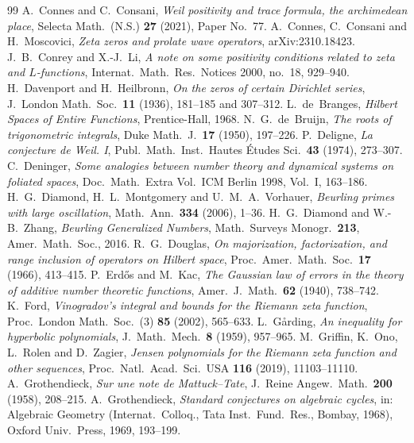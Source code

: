 \documentclass[11pt]{amsart}
\theoremstyle{definition}
\theoremstyle{remark}
\numberwithin{equation}{section}
\begin{document}
\begin{thebibliography}{99}
 A.~Connes and C.~Consani, \emph{Weil positivity and trace formula, the archimedean place}, Selecta Math.\ (N.S.) \textbf{27} (2021), Paper No.~77.
 A.~Connes, C.~Consani and H.~Moscovici, \emph{Zeta zeros and prolate wave operators}, arXiv:2310.18423.
 J.~B.~Conrey and X.-J.~Li, \emph{A note on some positivity conditions related to zeta and $L$-functions}, Internat.\ Math.\ Res.\ Notices 2000, no.~18, 929--940.
 H.~Davenport and H.~Heilbronn, \emph{On the zeros of certain Dirichlet series}, J.\ London Math.\ Soc.\ \textbf{11} (1936), 181--185 and 307--312.
 L.~de~Branges, \emph{Hilbert Spaces of Entire Functions}, Prentice-Hall, 1968.
 N.~G.~de~Bruijn, \emph{The roots of trigonometric integrals}, Duke Math.\ J.\ \textbf{17} (1950), 197--226.
 P.~Deligne, \emph{La conjecture de Weil. I}, Publ.\ Math.\ Inst.\ Hautes \'Etudes Sci.\ \textbf{43} (1974), 273--307.
 C.~Deninger, \emph{Some analogies between number theory and dynamical systems on foliated spaces}, Doc.\ Math.\ Extra Vol.\ ICM Berlin 1998, Vol.~I, 163--186.
 H.~G.~Diamond, H.~L.~Montgomery and U.~M.~A.~Vorhauer, \emph{Beurling primes with large oscillation}, Math.\ Ann.\ \textbf{334} (2006), 1--36.
 H.~G.~Diamond and W.-B.~Zhang, \emph{Beurling Generalized Numbers}, Math.\ Surveys Monogr.\ \textbf{213}, Amer.\ Math.\ Soc., 2016.
 R.~G.~Douglas, \emph{On majorization, factorization, and range inclusion of operators on Hilbert space}, Proc.\ Amer.\ Math.\ Soc.\ \textbf{17} (1966), 413--415.
 P.~Erd\H{o}s and M.~Kac, \emph{The Gaussian law of errors in the theory of additive number theoretic functions}, Amer.\ J.\ Math.\ \textbf{62} (1940), 738--742.
 K.~Ford, \emph{Vinogradov's integral and bounds for the Riemann zeta function}, Proc.\ London Math.\ Soc.\ (3) \textbf{85} (2002), 565--633.
 L.~G{\aa}rding, \emph{An inequality for hyperbolic polynomials}, J.\ Math.\ Mech.\ \textbf{8} (1959), 957--965.
 M.~Griffin, K.~Ono, L.~Rolen and D.~Zagier, \emph{Jensen polynomials for the Riemann zeta function and other sequences}, Proc.\ Natl.\ Acad.\ Sci.\ USA \textbf{116} (2019), 11103--11110.
 A.~Grothendieck, \emph{Sur une note de Mattuck--Tate}, J.\ Reine Angew.\ Math.\ \textbf{200} (1958), 208--215.
 A.~Grothendieck, \emph{Standard conjectures on algebraic cycles}, in: Algebraic Geometry (Internat.\ Colloq., Tata Inst.\ Fund.\ Res., Bombay, 1968), Oxford Univ.\ Press, 1969, 193--199.

\end{thebibliography}
\end{document}
